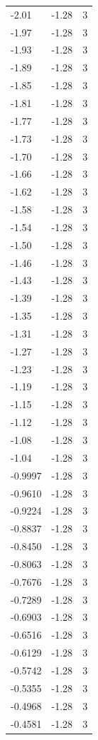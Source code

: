 \begin{longtable}{lrr}
  -2.01 & -1.28 & 3 \\
  -1.97 & -1.28 & 3 \\
  -1.93 & -1.28 & 3 \\
  -1.89 & -1.28 & 3 \\
  -1.85 & -1.28 & 3 \\
  -1.81 & -1.28 & 3 \\
  -1.77 & -1.28 & 3 \\
  -1.73 & -1.28 & 3 \\
  -1.70 & -1.28 & 3 \\
  -1.66 & -1.28 & 3 \\
  -1.62 & -1.28 & 3 \\
  -1.58 & -1.28 & 3 \\
  -1.54 & -1.28 & 3 \\
  -1.50 & -1.28 & 3 \\
  -1.46 & -1.28 & 3 \\
  -1.43 & -1.28 & 3 \\
  -1.39 & -1.28 & 3 \\
  -1.35 & -1.28 & 3 \\
  -1.31 & -1.28 & 3 \\
  -1.27 & -1.28 & 3 \\
  -1.23 & -1.28 & 3 \\
  -1.19 & -1.28 & 3 \\
  -1.15 & -1.28 & 3 \\
  -1.12 & -1.28 & 3 \\
  -1.08 & -1.28 & 3 \\
  -1.04 & -1.28 & 3 \\
  -0.9997 & -1.28 & 3 \\
  -0.9610 & -1.28 & 3 \\
  -0.9224 & -1.28 & 3 \\
  -0.8837 & -1.28 & 3 \\
  -0.8450 & -1.28 & 3 \\
  -0.8063 & -1.28 & 3 \\
  -0.7676 & -1.28 & 3 \\
  -0.7289 & -1.28 & 3 \\
  -0.6903 & -1.28 & 3 \\
  -0.6516 & -1.28 & 3 \\
  -0.6129 & -1.28 & 3 \\
  -0.5742 & -1.28 & 3 \\
  -0.5355 & -1.28 & 3 \\
  -0.4968 & -1.28 & 3 \\
  -0.4581 & -1.28 & 3 \\

\end{longtable}
